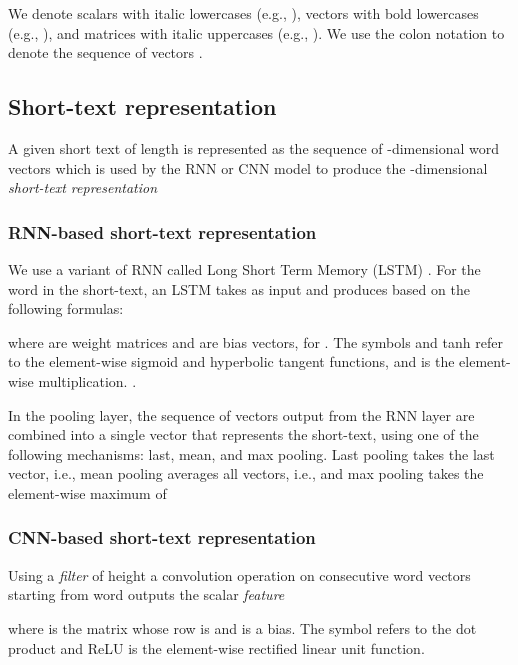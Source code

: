 \documentclass[11pt,letterpaper]{article}
\begin{document}
We denote scalars with italic lowercases (e.g., ), vectors with bold lowercases (e.g., ), and matrices with italic uppercases (e.g., ).
We use the colon notation  to denote the sequence of vectors .


\subsection{Short-text representation} \label{sec:representation}
A given short text of length  is represented as the sequence of -dimensional word vectors  which is used by the RNN or CNN model to produce the -dimensional \textit{short-text representation}    

\subsubsection{RNN-based short-text representation} \label{sec:rnn}
\noindent We use a variant of RNN called Long Short Term Memory (LSTM) \cite{hochreiter1997long}.
For the  word in the short-text, an LSTM takes as input  and produces  based on the following formulas:


\noindent where  are weight matrices and  are bias vectors, for .
The symbols  and tanh refer to the element-wise sigmoid and hyperbolic tangent functions, and  is the element-wise multiplication. .



In the pooling layer, the sequence of vectors 
output from the RNN layer are combined into a single vector  that represents the short-text, using one of the following mechanisms: last, mean, and max pooling. Last pooling takes the last vector, i.e.,  mean pooling averages all vectors, i.e.,  and max pooling takes the element-wise maximum of 


\subsubsection{CNN-based short-text representation} \label{sec:cnn}
\noindent 
Using a \emph{filter}  of height   
a convolution operation on  consecutive word vectors starting from  word outputs the scalar \emph{feature} 
\vspace{-0.1cm}

\vspace{-0.6cm}

\noindent where  is the matrix whose  row is 
and  is a bias. The symbol  refers to the dot product and ReLU is the element-wise rectified linear unit function. 
\end{document}
